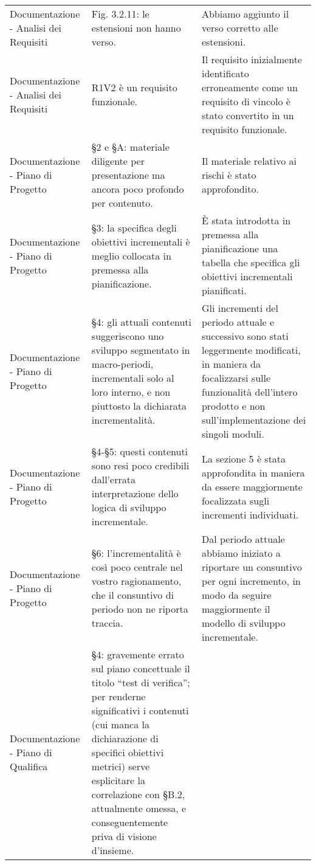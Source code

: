 \begin{longtable}{ 
				>{\centering}p{} 
				>{\centering}p{}
				>{\centering\arraybackslash}p{}}
				Documentazione - Analisi dei Requisiti
					&
				Fig. 3.2.11: le estensioni non hanno verso. 
					&
				Abbiamo aggiunto il verso corretto alle estensioni. 
					\\
					
				Documentazione - Analisi dei Requisiti
					&
				R1V2 è un requisito funzionale.
					&
				Il requisito inizialmente identificato erroneamente come un requisito di vincolo è stato convertito in un requisito funzionale. 
					\\
				
				Documentazione - Piano di Progetto
					&
				§2 e §A: materiale diligente per presentazione ma ancora poco profondo per contenuto. 
					&
				Il materiale relativo ai rischi è stato approfondito.
					\\
					
				Documentazione - Piano di Progetto
					&
				§3: la specifica degli obiettivi incrementali è meglio collocata in premessa alla pianificazione. 
					&
				È stata introdotta in premessa alla pianificazione una tabella che specifica gli obiettivi incrementali pianificati.
					\\
					
				Documentazione - Piano di Progetto
					&
				§4: gli attuali contenuti suggeriscono uno sviluppo segmentato in macro-periodi, incrementali solo al loro interno, e non piuttosto la dichiarata incrementalità. 
					&
				Gli incrementi del periodo attuale e successivo sono stati leggermente modificati, in maniera da focalizzarsi sulle funzionalità dell’intero prodotto e non sull’implementazione dei singoli moduli.
					\\
					
				Documentazione - Piano di Progetto
					&
				§4-§5: questi contenuti sono resi poco credibili dall’errata interpretazione dello logica di sviluppo incrementale. 
					&
				La sezione 5 è stata approfondita in maniera da essere maggiormente focalizzata sugli incrementi individuati.
					\\
					
				Documentazione - Piano di Progetto
					&
				§6: l’incrementalità è così poco centrale nel vostro ragionamento, che il consuntivo di periodo non ne riporta traccia. 
					&
				Dal periodo attuale abbiamo iniziato a riportare un consuntivo per ogni incremento, in modo da seguire maggiormente il modello di sviluppo incrementale.
					\\
					
				Documentazione - Piano di Qualifica
					&
				§4: gravemente errato sul piano concettuale il titolo “test di verifica”; per renderne significativi i contenuti (cui manca la dichiarazione di specifici obiettivi metrici) serve esplicitare la correlazione con §B.2, attualmente omessa, e conseguentemente priva di visione d’insieme. 
					&
				

\end{longtable}
